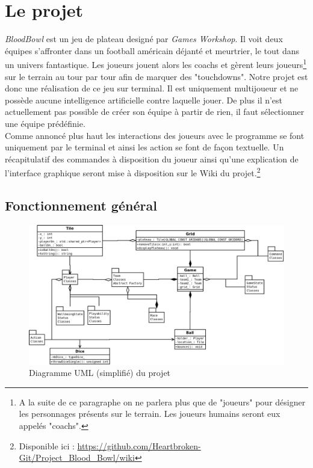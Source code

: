 \documentclass{article}
\begin{document}
\section{Le projet}
    
    \emph{BloodBowl} est un jeu de plateau designé par \emph{Games Workshop}. Il voit deux équipes s'affronter dans un football américain déjanté et meurtrier, le tout dans un univers fantastique. Les joueurs jouent alors les coachs et gèrent leurs joueurs\footnote{A la suite de ce paragraphe on ne parlera plus que de "joueurs" pour désigner les personnages présents sur le terrain. Les joueurs humains seront eux appelés "coachs".} sur le terrain au tour par tour afin de marquer des "touchdowns". Notre projet est donc une réalisation de ce jeu sur terminal. Il est uniquement multijoueur et ne possède aucune intelligence artificielle contre laquelle jouer. De plus il n'est actuellement pas possible de créer son équipe à partir de rien, il faut sélectionner une équipe prédéfinie.\\
    Comme annoncé plus haut les interactions des joueurs avec le programme se font uniquement par le terminal et ainsi les action se font de façon textuelle. Un récapitulatif des commandes à disposition du joueur ainsi qu'une explication de l'interface graphique seront mise à disposition sur le Wiki du projet.\footnote{Disponible ici : \url{https://github.com/Heartbroken-Git/Project_Blood_Bowl/wiki}} 
    
    \subsection{Fonctionnement général}
        
        \begin{figure}[H]
            \centerline{\includegraphics[scale=0.5]{img/UMLMain.png}}
            \caption{\label{DiaMain} Diagramme UML (simplifié) du projet}
        \end{figure}
        
\end{document}
